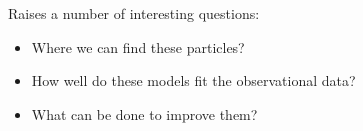 

Raises a number of interesting questions:

\begin{itemize}
    \item Where we can find these particles?
    \item How well do these models fit the observational data?
    \item What can be done to improve them?
\end{itemize}



